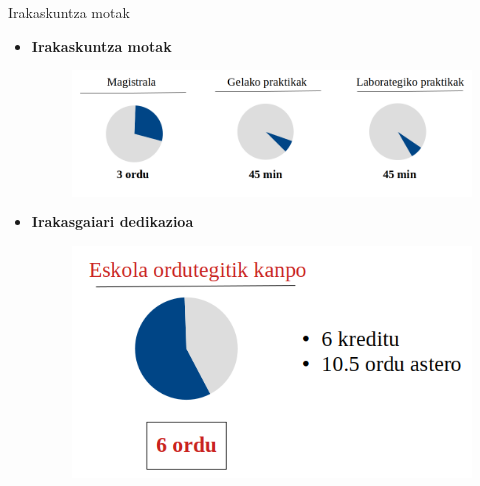 \documentclass[
 10pt,%
 compress,%
 t,       %
 xcolor=svgnames
]{beamer}
\theoremstyle{definition} \newtheorem{definicion}{Definicion}[section]
\theoremstyle{propiedades} \newtheorem{propiedades}{Propiedades}[section]
\begin{document}




\begin{frame}{Irakaskuntza motak}


\small

\begin{itemize}


\item \textbf{Irakaskuntza motak}  

\begin{figure}
	
	\begin{minipage}{.9\textwidth}
		\colorbox{white}  {\includegraphics[width=0.9\linewidth]{Dedikazioa1}}
	\end{minipage}
\end{figure}

\medskip

\item \textbf{Irakasgaiari dedikazioa}
%


\begin{figure}
%	
	\begin{minipage}{.7\textwidth}
		\colorbox{white}  {\includegraphics[width=0.7\linewidth]{Dedikazioa2}}
	\end{minipage}
\end{figure}






\end{itemize}
\end{frame}
\end{document}
